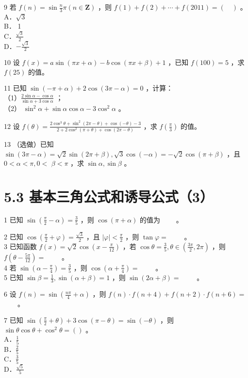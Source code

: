 \documentclass[10pt]{article}
\begin{document}
9 若 \(f(n)=\sin \frac{n}{3} \pi(n \in \mathbf{Z})\) ，则 \(f(1)+f(2)+\cdots+f(2011)=(\quad)\) 。\\
A．\(\sqrt{3}\)\\
B． 1\\
C．\(\frac{\sqrt{3}}{2}\)\\
D．\(-\frac{\sqrt{3}}{2}\)

10 设 \(f(x)=a \sin (\pi x+\alpha)-b \cos (\pi x+\beta)+1\) ，已知 \(f(100)=5\) ，求 \(f(25)\) 的值。

11 已知 \(\sin (-\pi+\alpha)+2 \cos (3 \pi-\alpha)=0\) ，计算：\\
（1）\(\frac{2 \sin \alpha-\cos \alpha}{\sin \alpha+3 \cos \alpha}\) ；\\
（2） \(\sin ^{2} \alpha+\sin \alpha \cos \alpha-3 \cos ^{2} \alpha\) 。

12 设 \(f(\theta)=\frac{2 \cos ^{3} \theta+\sin ^{2}(2 \pi-\theta)+\cos (-\theta)-3}{2+2 \cos ^{2}(\pi+\theta)+\cos (2 \pi-\theta)}\) ，求 \(f\left(\frac{\pi}{3}\right)\) 的值。

13 （选做）已知 \(\sin (3 \pi-\alpha)=\sqrt{2} \sin (2 \pi+\beta), \sqrt{3} \cos (-\alpha)=-\sqrt{2} \cos (\pi+\beta)\) ，且 \(0<\alpha<\pi, 0<\) \(\beta<\pi\) ，求 \(\sin \alpha, \sin \beta\) 。

\section*{5.3 基本三角公式和诱导公式（3）}
1 已知 \(\sin \left(\frac{\pi}{2}-\alpha\right)=\frac{3}{5}\) ，则 \(\cos (\pi+\alpha)\) 的值为 \(\qquad\)。

2 已知 \(\cos \left(\frac{\pi}{2}+\varphi\right)=\frac{\sqrt{3}}{2}\) ，且 \(|\varphi|<\frac{\pi}{2}\) ，则 \(\tan \varphi=\) \(\qquad\)。\\
3 已知函数 \(f(x)=\sqrt{2} \cos \left(x-\frac{\pi}{12}\right)\) ，若 \(\cos \theta=\frac{3}{5}, \theta \in\left(\frac{3 \pi}{2}, 2 \pi\right)\) ，则 \(f\left(\theta-\frac{5 \pi}{12}\right)=\) \(\qquad\)。\\
4 若 \(\sin \left(\alpha-\frac{\pi}{4}\right)=\frac{3}{5}\) ，则 \(\cos \left(\alpha+\frac{\pi}{4}\right)=\) \(\qquad\)。\\
5 已知 \(\sin \beta=\frac{1}{3}, \sin (\alpha+\beta)=1\) ，则 \(\sin (2 \alpha+\beta)=\) \(\qquad\)。

6 设 \(f(n)=\sin \left(\frac{n \pi}{4}+\alpha\right)\) ，则 \(f(n) \cdot f(n+4)+f(n+2) \cdot f(n+6)=\) \(\qquad\)。

7 已知 \(\sin \left(\frac{\pi}{2}+\theta\right)+3 \cos (\pi-\theta)=\sin (-\theta)\) ，则 \(\sin \theta \cos \theta+\cos ^{2} \theta=()\) 。\\
A．\(\frac{1}{5}\)\\
B．\(\frac{2}{5}\)\\
C．\(\frac{3}{5}\)\\
D．\(\frac{\sqrt{5}}{5}\)
\end{document}
